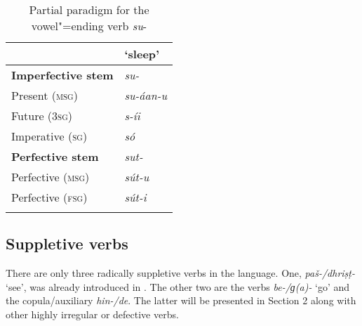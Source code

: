 \begin{table}[ht]
\caption{Partial paradigm for the vowel"=ending verb \textit{su}-}

\begin{tabularx}{.5\textwidth}{ l@{\hspace{20pt}} Q }
\lsptoprule
&
\textbf{`sleep'}\\\hline
\textbf{Imperfective stem} &
\textit{su-} \\
Present (\textsc{msg}) &
\textit{su-áan-u} \\
Future (\textsc{3sg}) &
\textit{s-íi} \\
Imperative (\textsc{sg}) &
\textit{só} \\
\textbf{Perfective stem} &
\textit{sut-} \\
Perfective (\textsc{msg}) &
\textit{sút-u} \\
Perfective (\textsc{fsg}) &
\textit{sút-i} \\\lspbottomrule
\end{tabularx}
\label{tab:8-12}
\end{table}


\subsection{Suppletive verbs}
\label{subsec:8-3-11}


There are only three radically suppletive verbs in the language. One, \textit{paš-/dhriṣṭ-} `see', was already introduced in . The other two are the verbs \textit{be-/ɡ(a)-} `go' and the copula/auxiliary \textit{hin-/de}. The latter will be presented in Section 2 along with other highly irregular or defective verbs. 


